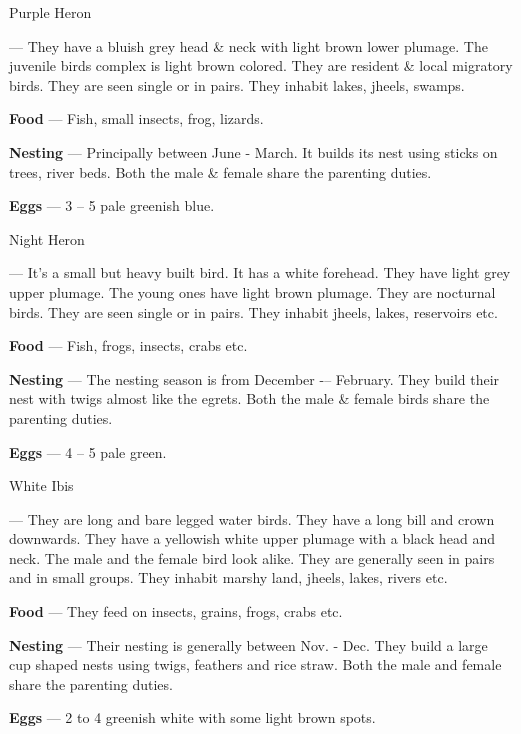 \begin{bird}{Purple Heron}

 --- They have a bluish grey head \& neck with light brown lower plumage. The juvenile birds complex is light brown colored. They are resident \& local migratory birds. They are seen single or in pairs. They inhabit lakes, jheels, swamps.

{\large\bf Food} --- Fish, small insects, frog, lizards.

{\large\bf Nesting} --- Principally between June - March. It builds its nest using sticks on trees, river beds. Both the male \& female share the parenting duties.

{\large\bf Eggs} --- 3 -- 5 pale greenish blue.
\end{bird}

\begin{bird}{Night Heron}

 --- It's a small but heavy built bird. It has a white forehead. They have light grey upper plumage. The young ones have light brown plumage. They are nocturnal birds. They are seen single or in pairs. They inhabit jheels, lakes, reservoirs etc.

{\large\bf Food} --- Fish, frogs, insects, crabs etc.

{\large\bf Nesting} --- The nesting season is from December -– February. They build their nest with twigs almost like the egrets. Both the male \& female birds share the parenting duties.

{\bf Eggs} --- 4 -- 5 pale green.
\end{bird}


\begin{bird}{White Ibis}

 --- They are long and bare legged water birds. They have a long bill and crown downwards. They have a yellowish white upper plumage with a black head and neck. The male and the female bird look alike. They are generally seen in pairs and in small groups. They inhabit marshy land, jheels, lakes, rivers etc.

{\large\bf Food} --- They feed on insects, grains, frogs, crabs etc.

{\large\bf Nesting} --- Their nesting is generally between Nov. - Dec. They build a large cup shaped nests using twigs, feathers and rice straw. Both the male and female share the parenting duties. 

{\large\bf Eggs} --- 2 to 4 greenish white with some light brown spots.
\end{bird}

